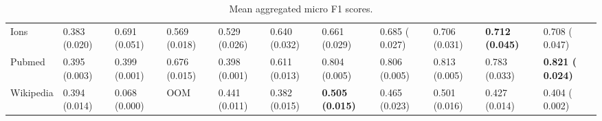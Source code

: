 \documentclass[twoside,11pt]{article}
\begin{document}
\begin{table}[htb!]
{\begin{tabular}{lllllllllll}
Ions               &   0.383 (0.020) &  0.691 (0.051) &  0.569 (0.018) &  0.529 (0.026) &   0.640 (0.032) &  0.661 (0.029) &  0.685 ( 0.027) &  0.706 (0.031) &\bfseries  0.712 (0.045) &  0.708 ( 0.047)\\
Pubmed             &  0.395 (0.003) &  0.399 (0.001) &  0.676 (0.015) &  0.398 (0.001) &  0.611 (0.013) &  0.804 (0.005) &  0.806 (0.005) &  0.813 (0.005) &  0.783 (0.033) &\bfseries  0.821 ( 0.024)\\
Wikipedia          &  0.394 (0.014) &    0.068 (0.000) &              OOM &  0.441 (0.011) &  0.382 (0.015) &\bfseries  0.505 (0.015) &  0.465 (0.023) &  0.501 (0.016) &  0.427 (0.014) &  0.404 ( 0.002)\\
\bottomrule
\end{tabular}
} 	\caption{Mean aggregated micro F1 scores.}
	\label{tab-micro}
\end{table}
\end{document}

